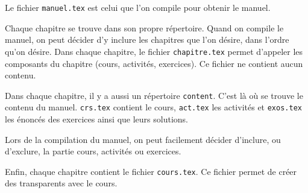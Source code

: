 Le fichier \verb|manuel.tex| est celui que l'on compile pour obtenir le manuel.

Chaque chapitre se trouve dans son propre répertoire. Quand on compile le manuel, on peut décider d'y inclure les chapitres que l'on désire, dans l'ordre qu'on désire.  Dans chaque chapitre, le fichier  \verb|chapitre.tex| permet d'appeler les composants du chapitre (cours, activités, exercices). Ce fichier ne contient aucun contenu.

Dans chaque chapitre, il y a aussi un répertoire \verb|content|. C'est là où se trouve le contenu du manuel. \verb|crs.tex| contient le cours, \verb|act.tex| les activités et \verb|exos.tex| les énoncés des exercices ainsi que leurs solutions.

Lors de la compilation du manuel, on peut facilement décider d'inclure, ou d'exclure, la partie cours, activités ou exercices.

Enfin, chaque chapitre contient le fichier \verb|cours.tex|. Ce fichier permet de créer des transparents avec le cours.


